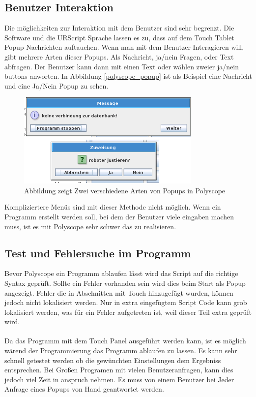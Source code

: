 \subsection{Benutzer Interaktion}
\label{user_interaktion_polyscope_rel}

Die möglichkeiten zur Interaktion mit dem Benutzer sind sehr begrenzt. Die Software und die URScript Sprache lassen es zu, dass auf dem Touch Tablet Popup Nachrichten auftauchen. Wenn man mit dem Benutzer Interagieren will, gibt mehrere Arten dieser Popups.
Als Nachricht, ja/nein Fragen, oder Text abfragen. Der Benutzer kann dann mit einen Text oder wählen zweier ja/nein buttons anworten. In Abbildung \ref{polyscope_popup} 
ist als Beispiel eine Nachricht und eine Ja/Nein Popup zu sehen.

\begin{figure}[ht]
  \centering
    \includegraphics[width=0.8\textwidth]{pic/popup_question.png}
      \caption[Popup in Polyscipe]{Abbildung zeigt Zwei verschiedene Arten von Popups in Polyscope}
      \label{fig:polyscope_popup}
\end{figure}

Kompliziertere Menüs sind mit dieser Methode nicht möglich. Wenn ein Programm erstellt werden soll, bei dem der Benutzer viele eingaben machen muss, ist es mit Polyscope sehr schwer das zu realisieren.

\subsection{Test und Fehlersuche im Programm}
\label{debuggin_polyscope_rel}

Bevor Polyscope ein Programm ablaufen lässt wird das Script auf die richtige Syntax geprüft. Sollte ein Fehler vorhanden sein wird dies beim Start als Popup angezeigt. Fehler die in Abschnitten mit Touch hinzugefügt wurden, können jedoch nicht lokalisiert werden. Nur in extra eingefügtem Script Code kann grob lokalisiert werden, was für ein Fehler aufgetreten ist, weil dieser Teil extra geprüft wird.
\\\\
Da das Programm mit dem Touch Panel ausgeführt werden kann, ist es möglich wärend der Programmierung das Programm ablaufen zu lassen. Es kann sehr schnell getestet werden ob die gewünchten Einstellungen dem Ergebniss entsprechen. Bei Großen Programen mit vielen Benutzeranfragen, kann dies jedoch viel Zeit in anspruch nehmen. Es muss von einem Benutzer bei Jeder Anfrage eines Popups von Hand geantwortet werden.

